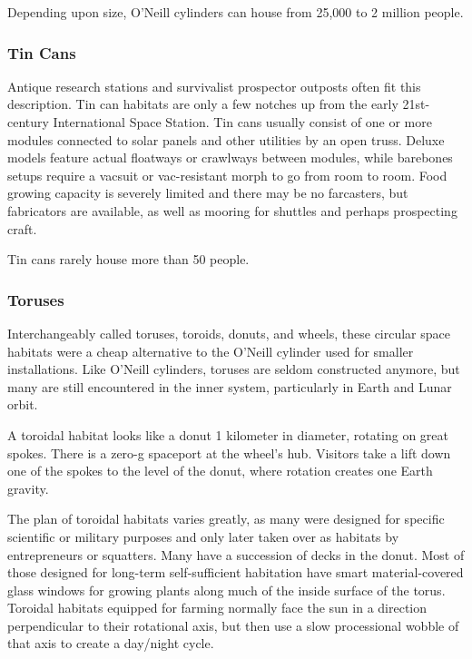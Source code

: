 Depending upon size, O'Neill cylinders can house from 25,000 to 2 million people. 

\subsubsection{Tin Cans} 

Antique research stations and survivalist prospector outposts often fit this description. Tin can habitats are only a few notches up from the early 21st-century International Space Station. Tin cans usually consist of one or more modules connected to solar panels and other utilities by an open truss. Deluxe models feature actual floatways or crawlways between modules, while barebones setups require a vacsuit or vac-resistant morph to go from room to room. Food growing capacity is severely limited and there may be no farcasters, but fabricators are available, as well as mooring for shuttles and perhaps prospecting craft. 

Tin cans rarely house more than 50 people. 

\subsubsection{Toruses} 

Interchangeably called toruses, toroids, donuts, and wheels, these circular space habitats were a cheap alternative to the O'Neill cylinder used for smaller installations. Like O'Neill cylinders, toruses are seldom constructed anymore, but many are still encountered in the inner system, particularly in Earth and Lunar orbit. 

A toroidal habitat looks like a donut 1 kilometer in diameter, rotating on great spokes. There is a zero-g spaceport at the wheel's hub. Visitors take a lift down one of the spokes to the level of the donut, where rotation creates one Earth gravity. 

The plan of toroidal habitats varies greatly, as many were designed for specific scientific or military purposes and only later taken over as habitats by entrepreneurs or squatters. Many have a succession of decks in the donut. Most of those designed for long-term self-sufficient habitation have smart material-covered glass windows for growing plants along much of the inside surface of the torus. Toroidal habitats equipped for farming normally face the sun in a direction perpendicular to their rotational axis, but then use a slow processional wobble of that axis to create a day/night cycle. 

